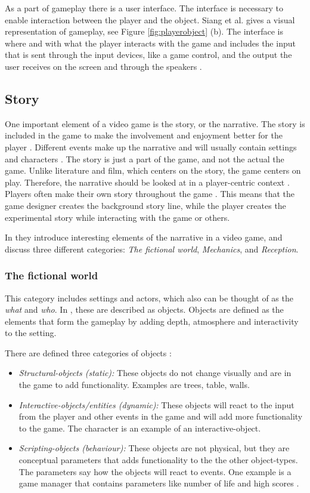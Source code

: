 As a part of gameplay there is a user interface. The interface is necessary to enable interaction between the player and the object. Siang et al. \cite{umlapproach} gives a visual representation of gameplay, see Figure \ref{fig:playerobject} (b). The interface is where and with what the player interacts with the game and includes the input that is sent through the input devices, like a game control, and the output the user receives on the screen and through the speakers \cite{umlapproach}.

\subsection{Story}
One important element of a video game is the story, or the narrative. The story is included in the game to make the involvement and enjoyment better for the player \cite{umlapproach}. Different events make up the narrative and will usually contain settings and characters \cite{understandingvg}. The story is just a part of the game, and not the actual the game. Unlike literature and film, which centers on the story, the game centers on play. Therefore, the narrative should be looked at in a player-centric context \cite{gametheory}. Players often make their own story throughout the game \cite{umlapproach}. This means that the game designer creates the background story line, while the player creates the experimental story while interacting with the game or others. 

In \cite{understandingvg} they introduce interesting elements of the narrative in a video game, and discuss three different categories: \emph{The fictional world}, \emph{Mechanics}, and \emph{Reception}.

\subsubsection{The fictional world}
\label{subsub:fictionalworld}
This category includes settings and actors, which also can be thought of as the \emph{what} and \emph{who}. In \cite{beram}, these are described as objects. Objects are defined as the elements that form the gameplay by adding depth, atmosphere and interactivity to the setting.

There are defined three categories of objects \cite{beram}:
\begin{itemize}
\item \emph{Structural-objects (static):} These objects do not change visually and are in the game to add functionality. Examples are trees, table, walls.
\item \emph{Interactive-objects/entities (dynamic):} These objects will react to the input from the player and other events in the game and will add more functionality to the game. The character is an example of an interactive-object.
\item \emph{Scripting-objects (behaviour):} These objects are not physical, but they are conceptual parameters that adds functionality to the the other object-types. The parameters say how the objects will react to events. One example is a game manager that contains parameters like number of life and high scores \cite{umlapproach}. 
\end{itemize}

